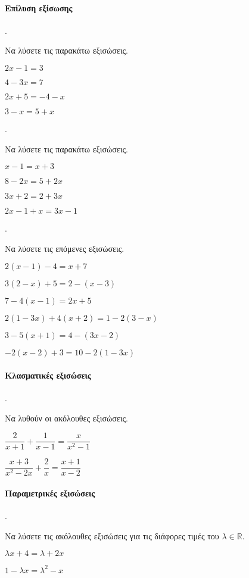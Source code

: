 \documentclass[11pt,a4paper,twocolumn]{article}
\newcounter{askhsh}
\newcommand{\askhsh}{{\large\theaskhsh.}\ \addtocounter{askhsh}{1}}
\begin{document}
\paragraph{Επίλυση εξίσωσης}
\askhsh Να λύσετε τις παρακάτω εξισώσεις.
\begin{multicols}{2}
\begin{alist}
\item $2x-1=3$
\item $4-3x=7$
\item $2x+5=-4-x$
\item $3-x=5+x$
\end{alist}
\end{multicols}
\askhsh Να λύσετε τις παρακάτω εξισώσεις.
\begin{multicols}{2}
\begin{alist}
\item $x-1=x+3$
\item $8-2x=5+2x$
\item $3x+2=2+3x$
\item $2x-1+x=3x-1$
\end{alist}
\end{multicols}
\askhsh Να λύσετε τις επόμενες εξισώσεις.
\begin{alist}
\item $2(x-1)-4=x+7$
\item $3(2-x)+5=2-(x-3)$
\item $7-4(x-1)=2x+5$
\item $2(1-3x)+4(x+2)=1-2(3-x)$
\item $3-5(x+1)=4-(3x-2)$
\item $-2(x-2)+3=10-2(1-3x)$
\end{alist}
\paragraph{Κλασματικές εξισώσεις}
\askhsh Να λυθούν οι ακόλουθες εξισώσεις.
\begin{alist}
\item $\dfrac{2}{x+1}+\dfrac{1}{x-1}=\dfrac{x}{x^2-1}$
\item $\dfrac{x+3}{x^2-2x}+\dfrac{2}{x}=\dfrac{x+1}{x-2}$
\end{alist}
\paragraph{Παραμετρικές εξισώσεις}
\askhsh Να λύσετε τις ακόλουθες εξισώσεις για τις διάφορες τιμές του $\lambda\in\mathbb{R}$.
\begin{alist}
\item $\lambda x+4=\lambda+2x$
\item $1-\lambda x=\lambda^2-x$
\end{alist}
\end{document}
